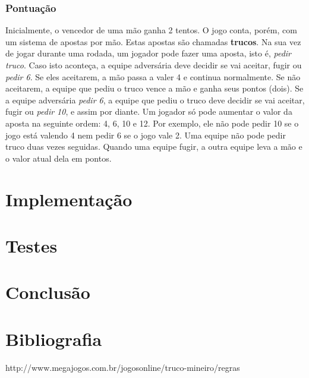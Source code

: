 \documentclass[a4paper,12pt]{article}
\begin{document}
\subsubsection{Pontuação}
Inicialmente, o vencedor de uma mão ganha 2 tentos. O jogo conta, porém, com um sistema de apostas por mão. Estas apostas são chamadas \textbf{trucos}. Na sua vez de jogar durante uma rodada, um jogador pode fazer uma aposta, isto é, \emph{pedir truco}. Caso isto aconteça, a equipe adversária deve decidir se vai aceitar, fugir ou \emph{pedir 6}. Se eles aceitarem, a mão passa a valer 4 e continua normalmente. Se não aceitarem, a equipe que pediu o truco vence a mão e ganha seus pontos (dois). Se a equipe adversária \emph{pedir 6}, a equipe que pediu o truco deve decidir se vai aceitar, fugir ou \emph{pedir 10}, e assim por diante. Um jogador só pode aumentar o valor da aposta na seguinte ordem: 4, 6, 10 e 12. Por exemplo, ele não pode pedir 10 se o jogo está valendo 4 nem pedir 6 se o jogo vale 2. Uma equipe não pode pedir truco duas vezes seguidas. Quando uma equipe fugir, a outra equipe leva a mão e o valor atual dela em pontos.


\section{Implementação}


\section{Testes}


\section{Conclusão}


\section{Bibliografia}
http://www.megajogos.com.br/jogosonline/truco-mineiro/regras
\end{document}
